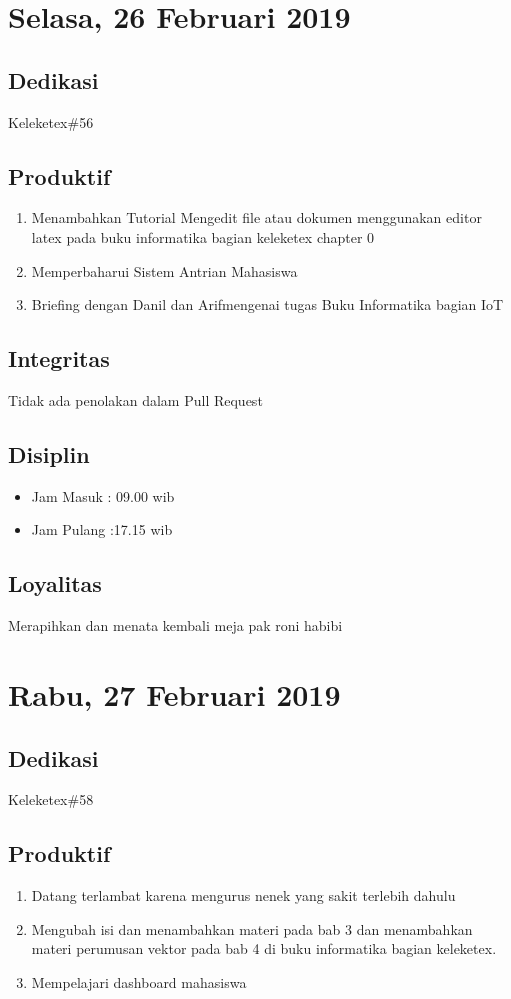 \section{Selasa, 26 Februari 2019}
\subsection{Dedikasi}
Keleketex\#56
\subsection{Produktif}
\begin{enumerate}
\item Menambahkan Tutorial Mengedit file atau dokumen menggunakan editor latex pada buku informatika bagian keleketex chapter 0
\item Memperbaharui Sistem Antrian Mahasiswa
\item Briefing dengan Danil dan Arifmengenai tugas Buku Informatika bagian IoT
\end{enumerate}
\subsection{Integritas}
Tidak ada penolakan dalam Pull Request
\subsection{Disiplin}
\begin{itemize}
\item Jam Masuk : 09.00 wib
\item Jam Pulang :17.15 wib
\end{itemize}
\subsection{Loyalitas}
Merapihkan dan menata kembali meja pak roni habibi

\section{Rabu, 27 Februari 2019}
\subsection{Dedikasi}
Keleketex\#58
\subsection{Produktif}
\begin{enumerate}
\item Datang terlambat karena mengurus nenek yang sakit terlebih dahulu
\item Mengubah isi dan menambahkan materi pada bab 3  dan menambahkan materi perumusan vektor pada bab 4 di buku informatika bagian keleketex.
\item Mempelajari dashboard mahasiswa
\end{enumerate}

